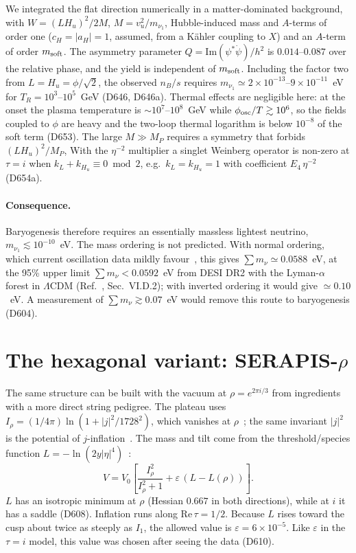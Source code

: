 \documentclass[aps,prd,twocolumn,superscriptaddress,nofootinbib,floatfix]{revtex4-2}
\begin{document}
We integrated the flat direction numerically in a matter-dominated background, with $W=(LH_u)^2/2M$, $M=v_u^2/m_{\nu_1}$, Hubble-induced mass and $A$-terms of order one ($c_H=|a_H|=1$, assumed, from a Kähler coupling to $X$) and an $A$-term of order $m_{\rm soft}$. The asymmetry parameter $Q=\mathrm{Im}(\psi^*\dot\psi)/h^2$ is $0.014$--$0.087$ over the relative phase, and the yield is independent of $m_{\rm soft}$. Including the factor two from $L=H_u=\phi/\sqrt2$, the observed $n_B/s$ requires $m_{\nu_1}\simeq2\times10^{-13}$--$9\times10^{-11}$~eV for $T_R=10^3$--$10^5$~GeV (D646, D646a). Thermal effects are negligible here: at the onset the plasma temperature is $\sim10^7$--$10^8$~GeV while $\phi_{\rm osc}/T\gtrsim10^6$, so the fields coupled to $\phi$ are heavy and the two-loop thermal logarithm is below $10^{-8}$ of the soft term (D653). The large $M\gg M_P$ requires a symmetry that forbids $(LH_u)^2/M_P$, With the $\eta^{-2}$ multiplier a singlet Weinberg operator is non-zero at $\tau=i$ when $k_L+k_{H_u}\equiv0\bmod2$, e.g.\ $k_L=k_{H_u}=1$ with coefficient $E_4\,\eta^{-2}$ (D654a).

\paragraph{Consequence.} Baryogenesis therefore requires an essentially massless lightest neutrino, $m_{\nu_1}\lesssim10^{-10}$~eV. The mass ordering is not predicted. With normal ordering, which current oscillation data mildly favour~\cite{arXiv_2410_05380}, this gives $\sum m_\nu\simeq0.0588$~eV, at the 95\% upper limit $\sum m_\nu < 0.0592$~eV from DESI DR2 with the Lyman-$\alpha$ forest in $\Lambda$CDM (Ref.~\cite{arXiv_2607_27410}, Sec.~VI.D.2); with inverted ordering it would give $\simeq0.10$~eV. A measurement of $\sum m_\nu \gtrsim 0.07$~eV would remove this route to baryogenesis (D604).

\section{The hexagonal variant: SERAPIS-$\rho$}\label{sec:rho}
The same structure can be built with the vacuum at $\rho = e^{2\pi i/3}$ from ingredients with a more direct string pedigree. The plateau uses $I_\rho = (1/4\pi)\ln(1+|j|^2/1728^2)$, which vanishes at $\rho$~\cite{arXiv_2408_05203}; the same invariant $|j|^2$ is the potential of $j$-inflation~\cite{arXiv_1612_09559}. The mass and tilt come from the threshold/species function $L = -\ln(2y|\eta|^4)$~\cite{arXiv_2407_12081,arXiv_2411_08467}:
\begin{equation}
V = V_0\left[\frac{I_\rho^2}{I_\rho^2+1} + \varepsilon\,(L - L(\rho))\right].
\end{equation}
$L$ has an isotropic minimum at $\rho$ (Hessian $0.667$ in both directions), while at $i$ it has a saddle (D608). Inflation runs along $\mathrm{Re}\,\tau = 1/2$. Because $L$ rises toward the cusp about twice as steeply as $I_1$, the allowed value is $\varepsilon = 6\times10^{-5}$. Like $\varepsilon$ in the $\tau = i$ model, this value was chosen after seeing the data (D610).
\end{document}
